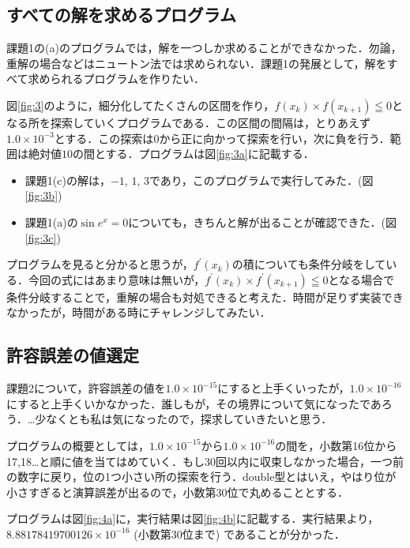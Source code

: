 \documentclass[12pt]{jarticle}
\begin{document}
\subsection{すべての解を求めるプログラム}
課題1の(a)のプログラムでは，解を一つしか求めることができなかった．勿論，重解の場合などはニュートン法では求められない．課題1の発展として，解をすべて求められるプログラムを作りたい．

図\ref{fig:3}のように，細分化してたくさんの区間を作り，$f(x_k) \times f(x_{k+1}) \leqq 0$となる所を探索していくプログラムである．この区間の間隔は，とりあえず$1.0 \times 10^{-3}$とする．この探索は$0$から正に向かって探索を行い，次に負を行う．範囲は絶対値$10$の間とする．プログラムは図\ref{fig:3a}に記載する．

\begin{itemize}
\item 課題1(c)の解は，$-1$, $1$, $3$であり，このプログラムで実行してみた．(図\ref{fig:3b})
\item 課題1(a)の$\sin e^x=0$についても，きちんと解が出ることが確認できた．(図\ref{fig:3c})
\end{itemize}

プログラムを見ると分かると思うが，$f^{\prime}(x_k)$の積についても条件分岐をしている．今回の式にはあまり意味は無いが，$f^{\prime}(x_k) \times f^{\prime}(x_{k+1}) \leqq 0$となる場合で条件分岐することで，重解の場合も対処できると考えた．時間が足りず実装できなかったが，時間がある時にチャレンジしてみたい．

\subsection{許容誤差の値選定}

課題2について，許容誤差の値を$1.0 \times 10^{-15}$にすると上手くいったが，$1.0 \times 10^{-16}$にすると上手くいかなかった．誰しもが，その境界について気になったであろう．\ldots 少なくとも私は気になったので，探求していきたいと思う．

プログラムの概要としては，$1.0 \times 10^{-15}$から$1.0 \times 10^{-16}$の間を，小数第16位から17,18\ldots と順に値を当てはめていく．もし30回以内に収束しなかった場合，一つ前の数字に戻り，位の1つ小さい所の探索を行う．double型とはいえ，やはり位が小さすぎると演算誤差が出るので，小数第30位で丸めることとする．

プログラムは図\ref{fig:4a}に，実行結果は図\ref{fig:4b}に記載する．実行結果より，$8.88178419700126 \times 10^{-16}$ (小数第30位まで) であることが分かった．


\end{document}
